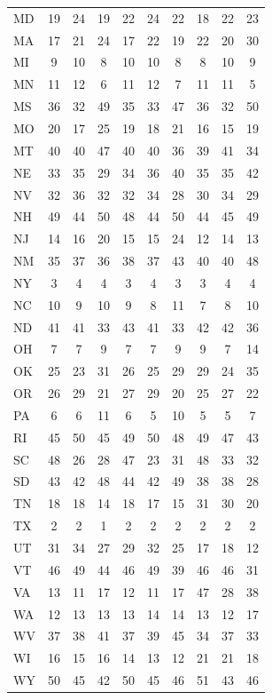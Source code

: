 \documentclass{article}
\begin{document}
\begin{table}[H]
\begin{tabular}{l*{9}{c}}
MD & 19 & 24 & 19 & 22 & 24 & 22 & 18 & 22 & 23 \\
MA & 17 & 21 & 24 & 17 & 22 & 19 & 22 & 20 & 30 \\
MI & 9 & 10 & 8 & 10 & 10 & 8 & 8 & 10 & 9 \\
MN & 11 & 12 & 6 & 11 & 12 & 7 & 11 & 11 & 5 \\
MS & 36 & 32 & 49 & 35 & 33 & 47 & 36 & 32 & 50 \\
MO & 20 & 17 & 25 & 19 & 18 & 21 & 16 & 15 & 19 \\
MT & 40 & 40 & 47 & 40 & 40 & 36 & 39 & 41 & 34 \\
NE & 33 & 35 & 29 & 34 & 36 & 40 & 35 & 35 & 42 \\
NV & 32 & 36 & 32 & 32 & 34 & 28 & 30 & 34 & 29 \\
NH & 49 & 44 & 50 & 48 & 44 & 50 & 44 & 45 & 49 \\
NJ & 14 & 16 & 20 & 15 & 15 & 24 & 12 & 14 & 13 \\
NM & 35 & 37 & 36 & 38 & 37 & 43 & 40 & 40 & 48 \\
NY & 3 & 4 & 4 & 3 & 4 & 3 & 3 & 4 & 4 \\
NC & 10 & 9 & 10 & 9 & 8 & 11 & 7 & 8 & 10 \\
ND & 41 & 41 & 33 & 43 & 41 & 33 & 42 & 42 & 36 \\
OH & 7 & 7 & 9 & 7 & 7 & 9 & 9 & 7 & 14 \\
OK & 25 & 23 & 31 & 26 & 25 & 29 & 29 & 24 & 35 \\
OR & 26 & 29 & 21 & 27 & 29 & 20 & 25 & 27 & 22 \\
PA & 6 & 6 & 11 & 6 & 5 & 10 & 5 & 5 & 7 \\
RI & 45 & 50 & 45 & 49 & 50 & 48 & 49 & 47 & 43 \\
SC & 48 & 26 & 28 & 47 & 23 & 31 & 48 & 33 & 32 \\
SD & 43 & 42 & 48 & 44 & 42 & 49 & 38 & 38 & 28 \\
TN & 18 & 18 & 14 & 18 & 17 & 15 & 31 & 30 & 20 \\
TX & 2 & 2 & 1 & 2 & 2 & 2 & 2 & 2 & 2 \\
UT & 31 & 34 & 27 & 29 & 32 & 25 & 17 & 18 & 12 \\
VT & 46 & 49 & 44 & 46 & 49 & 39 & 46 & 46 & 31 \\
VA & 13 & 11 & 17 & 12 & 11 & 17 & 47 & 28 & 38 \\
WA & 12 & 13 & 13 & 13 & 14 & 14 & 13 & 12 & 17 \\
WV & 37 & 38 & 41 & 37 & 39 & 45 & 34 & 37 & 33 \\
WI & 16 & 15 & 16 & 14 & 13 & 12 & 21 & 21 & 18 \\
WY & 50 & 45 & 42 & 50 & 45 & 46 & 51 & 43 & 46 \\
\bottomrule
\end{tabular}
\end{table}
\end{document}

